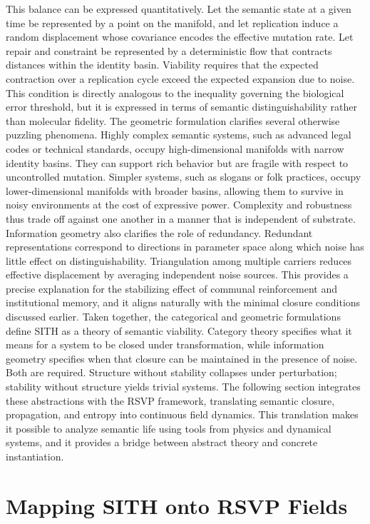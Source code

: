 \documentclass[11pt,oneside]{article}
\begin{document}
This balance can be expressed quantitatively. Let the semantic state at a given time be represented by a point on the manifold, and let replication induce a random displacement whose covariance encodes the effective mutation rate. Let repair and constraint be represented by a deterministic flow that contracts distances within the identity basin. Viability requires that the expected contraction over a replication cycle exceed the expected expansion due to noise. This condition is directly analogous to the inequality governing the biological error threshold, but it is expressed in terms of semantic distinguishability rather than molecular fidelity.
The geometric formulation clarifies several otherwise puzzling phenomena. Highly complex semantic systems, such as advanced legal codes or technical standards, occupy high-dimensional manifolds with narrow identity basins. They can support rich behavior but are fragile with respect to uncontrolled mutation. Simpler systems, such as slogans or folk practices, occupy lower-dimensional manifolds with broader basins, allowing them to survive in noisy environments at the cost of expressive power. Complexity and robustness thus trade off against one another in a manner that is independent of substrate.
Information geometry also clarifies the role of redundancy. Redundant representations correspond to directions in parameter space along which noise has little effect on distinguishability. Triangulation among multiple carriers reduces effective displacement by averaging independent noise sources. This provides a precise explanation for the stabilizing effect of communal reinforcement and institutional memory, and it aligns naturally with the minimal closure conditions discussed earlier.
Taken together, the categorical and geometric formulations define SITH as a theory of semantic viability. Category theory specifies what it means for a system to be closed under transformation, while information geometry specifies when that closure can be maintained in the presence of noise. Both are required. Structure without stability collapses under perturbation; stability without structure yields trivial systems.
The following section integrates these abstractions with the RSVP framework, translating semantic closure, propagation, and entropy into continuous field dynamics. This translation makes it possible to analyze semantic life using tools from physics and dynamical systems, and it provides a bridge between abstract theory and concrete instantiation.

\section{Mapping SITH onto RSVP Fields}
\end{document}
